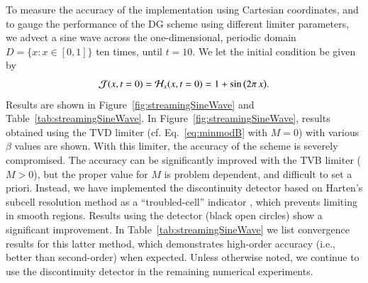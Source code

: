 \documentclass[11pt,letterpaper,twoside,english,final]{article}
\begin{document}
To measure the accuracy of the implementation using Cartesian coordinates, and to gauge the performance of the DG scheme using different limiter parameters, we advect a sine wave across the one-dimensional, periodic domain $D=\{x:x\in[0,1]\}$ ten times, until $t=10$.  
We let the initial condition be given by
\begin{equation}
  \mathcal{J}(x,t=0)=\mathcal{H}_{x}(x,t=0)=1+\sin\big(2\pi\,x\big).  
\end{equation}
Results are shown in Figure~\ref{fig:streamingSineWave} and Table~\ref{tab:streamingSineWave}.  
In Figure~\ref{fig:streamingSineWave}, results obtained using the TVD limiter (cf. Eq.~\eqref{eq:minmodB} with $M=0$) with various $\beta$ values are shown.  
With this limiter, the accuracy of the scheme is severely compromised.  
The accuracy can be significantly improved with the TVB limiter ($M>0$), but the proper value for $M$ is problem dependent, and difficult to set a priori.  
Instead, we have implemented the discontinuity detector based on Harten's subcell resolution method as a ``troubled-cell'' indicator \citep{harten_1989,qiuShu_2005}, which prevents limiting in smooth regions.  
Results using the detector (black open circles) show a significant improvement.  
In Table~\ref{tab:streamingSineWave} we list convergence results for this latter method, which demonstrates high-order accuracy (i.e., better than second-order) when expected.  
Unless otherwise noted, we continue to use the discontinuity detector in the remaining numerical experiments.  
\end{document}
